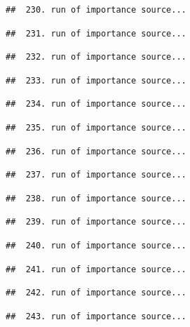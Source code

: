 \documentclass[
]{article}
\begin{document}
\begin{verbatim}
##  230. run of importance source...
\end{verbatim}

\begin{verbatim}
##  231. run of importance source...
\end{verbatim}

\begin{verbatim}
##  232. run of importance source...
\end{verbatim}

\begin{verbatim}
##  233. run of importance source...
\end{verbatim}

\begin{verbatim}
##  234. run of importance source...
\end{verbatim}

\begin{verbatim}
##  235. run of importance source...
\end{verbatim}

\begin{verbatim}
##  236. run of importance source...
\end{verbatim}

\begin{verbatim}
##  237. run of importance source...
\end{verbatim}

\begin{verbatim}
##  238. run of importance source...
\end{verbatim}

\begin{verbatim}
##  239. run of importance source...
\end{verbatim}

\begin{verbatim}
##  240. run of importance source...
\end{verbatim}

\begin{verbatim}
##  241. run of importance source...
\end{verbatim}

\begin{verbatim}
##  242. run of importance source...
\end{verbatim}

\begin{verbatim}
##  243. run of importance source...
\end{verbatim}
\end{document}
